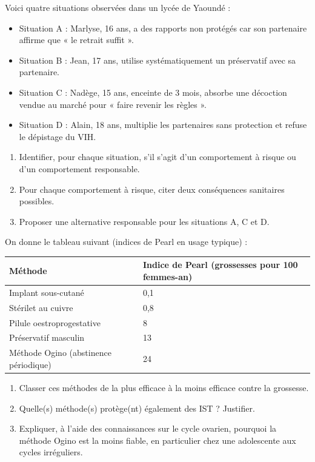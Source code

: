 \documentclass[11pt]{article}
\begin{document}
\begin{exercice}
Voici quatre situations observées dans un lycée de Yaoundé :
\begin{itemize}
\item Situation A : Marlyse, 16 ans, a des rapports non protégés car son partenaire affirme que « le retrait suffit ».
\item Situation B : Jean, 17 ans, utilise systématiquement un préservatif avec sa partenaire.
\item Situation C : Nadège, 15 ans, enceinte de 3 mois, absorbe une décoction vendue au marché pour « faire revenir les règles ».
\item Situation D : Alain, 18 ans, multiplie les partenaires sans protection et refuse le dépistage du VIH.
\end{itemize}
\begin{enumerate}
\item Identifier, pour chaque situation, s'il s'agit d'un comportement à risque ou d'un comportement responsable.
\item Pour chaque comportement à risque, citer deux conséquences sanitaires possibles.
\item Proposer une alternative responsable pour les situations A, C et D.
\end{enumerate}
\end{exercice}

\begin{exercice}
On donne le tableau suivant (indices de Pearl en usage typique) :

\begin{center}
\begin{tabularx}{\linewidth}{|l|X|}\hline
\rowcolor{popblueL} \textbf{Méthode} & \textbf{Indice de Pearl (grossesses pour 100 femmes-an)} \\ \hline
Implant sous-cutané & 0,1 \\ \hline
Stérilet au cuivre & 0,8 \\ \hline
Pilule oestroprogestative & 8 \\ \hline
Préservatif masculin & 13 \\ \hline
Méthode Ogino (abstinence périodique) & 24 \\ \hline
\end{tabularx}
\end{center}

\begin{enumerate}
\item Classer ces méthodes de la plus efficace à la moins efficace contre la grossesse.
\item Quelle(s) méthode(s) protège(nt) également des IST ? Justifier.
\item Expliquer, à l'aide des connaissances sur le cycle ovarien, pourquoi la méthode Ogino est la moins fiable, en particulier chez une adolescente aux cycles irréguliers.
\end{enumerate}
\end{exercice}
\end{document}
